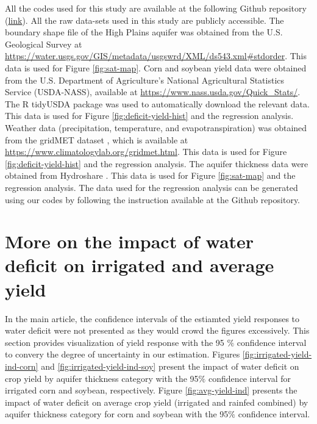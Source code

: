 \documentclass[
]{article}
\begin{document}
All the codes used for this study are available at the following Github repository (\href{https://github.com/tmieno2/Drought-Production-Risk-Aquifer}{link}). All the raw data-sets used in this study are publicly accessible. The boundary shape file of the High Plains aquifer was obtained from the U.S. Geological Survey at \url{https://water.usgs.gov/GIS/metadata/usgswrd/XML/ds543.xml#stdorder}. This data is used for Figure \ref{fig:sat-map}. Corn and soybean yield data were obtained from the U.S. Department of Agriculture's National Agricultural Statistics Service (USDA-NASS), available at \url{https://www.nass.usda.gov/Quick_Stats/}. The R tidyUSDA package was used to automatically download the relevant data. This data is used for Figure \ref{fig:deficit-yield-hist} and the regression analysis. Weather data (precipitation, temperature, and evapotranspiration) was obtained from the gridMET dataset \citep{Abatzoglou2013}, which is available at \url{https://www.climatologylab.org/gridmet.html}. This data is used for Figure \ref{fig:deficit-yield-hist} and the regression analysis. The aquifer thickness data were obtained from Hydroshare \citep{haacker2023}. This data is used for Figure \ref{fig:sat-map} and the regression analysis. The data used for the regression analysis can be generated using our codes by following the instruction available at the Github repository.

\clearpage

\hypertarget{appendix-appendix}{%
\appendix}


\hypertarget{reg-conf}{%
\section{More on the impact of water deficit on irrigated and average yield}\label{reg-conf}}

\setcounter{figure}{0}
\renewcommand{\thefigure}{A.\arabic{figure}}

In the main article, the confidence intervals of the estiamted yield responses to water deficit were not presented as they would crowd the figures excessively. This section provides visualization of yield response with the 95 \(\%\) confidence interval to convery the degree of uncertainty in our estimation. Figures \ref{fig:irrigated-yield-ind-corn} and \ref{fig:irrigated-yield-ind-soy} present the impact of water deficit on crop yield by aquifer thickness category with the 95\(\%\) confidence interval for irrigated corn and soybean, respectively. Figure \ref{fig:avg-yield-ind} presents the impact of water deficit on average crop yield (irrigated and rainfed combined) by aquifer thickness category for corn and soybean with the 95\(\%\) confidence interval.
\end{document}
